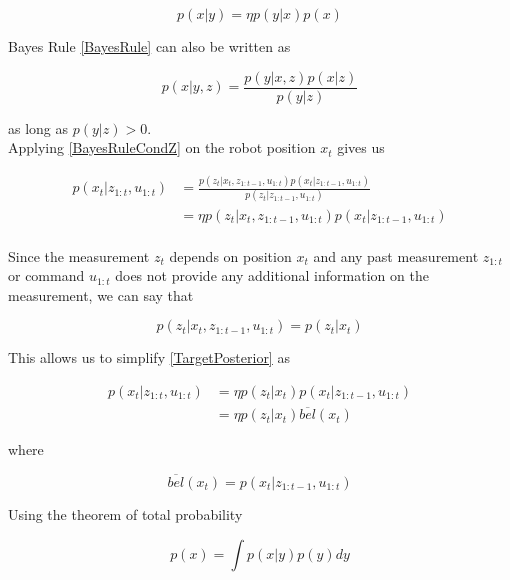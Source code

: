 \documentclass[conference]{IEEEtran}
\begin{document}
\begin{equation}\label{BayesRuleEta}
p(x|y) = \eta p(y|x) p(x)
\end{equation}

Bayes Rule \ref{BayesRule} can also be written as 

\begin{equation}\label{BayesRuleCondZ}
p(x|y,z) = \frac{p(y|x,z) p(x|z)}{p(y|z)}
\end{equation}

as long as $p(y|z)>0$.\\

Applying \ref{BayesRuleCondZ} on the robot position $x_t$ gives us

\begin{equation}\label{TargetPosterior}
\begin{aligned}
p(x_t|z_{1:t},u_{1:t}) &= \frac{p(z_t|x_t,z_{1:t-1},u_{1:t}) p(x_t|z_{1:t-1},u_{1:t})}{p(z_t|z_{1:t-1},u_{1:t})}\\
& = \eta p(z_t|x_t,z_{1:t-1},u_{1:t}) p(x_t|z_{1:t-1},u_{1:t})\\
\end{aligned}
\end{equation}

Since the measurement $z_t$ depends on position $x_t$ and any past measurement $z_{1:t}$ or command $u_{1:t} $ does not provide any additional information on the measurement, we can say that

\begin{equation}\label{SimplTargPost}
p(z_t|x_t,z_{1:t-1},u_{1:t}) = p(z_t|x_t)
\end{equation}

This allows us to simplify \ref{TargetPosterior} as

\begin{equation}\label{MoreSimplTargPost}
\begin{aligned}
p(x_t|z_{1:t},u_{1:t}) &= \eta p(z_t|x_t) p(x_t|z_{1:t-1}, u_{1:t})\\
&= \eta p(z_t|x_t) \overline{bel}(x_t)
\end{aligned}
\end{equation}

where

\begin{equation}\label{belief}
\overline{bel}(x_t) = p(x_t|z_{1:t-1}, u_{1:t})
\end{equation}

Using the theorem of total probability

\begin{equation}
p(x) = \int p(x|y) p(y) dy
\end{equation}
\end{document}
